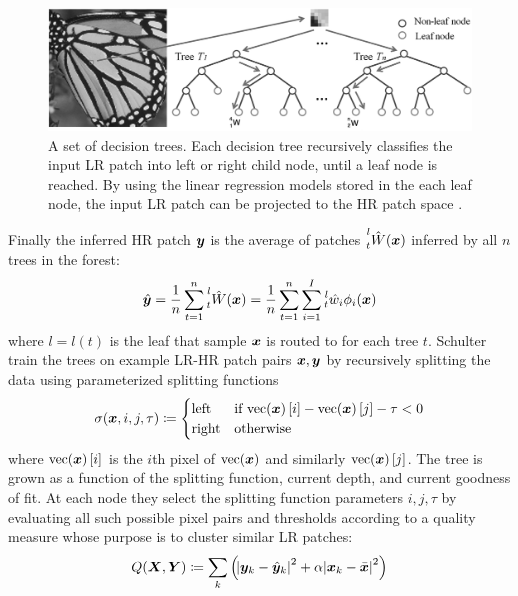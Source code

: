 \begin{figure}
    \centering
    \includegraphics[width=\linewidth,keepaspectratio]{figures/classical/FIRF.png}
    \caption{A set of decision trees. Each decision tree recursively classifies the input LR patch into left or right child node, until a leaf node is reached. By using the linear regression models stored in the each leaf node, the input LR patch can be projected to the HR patch space \cite{Huang}.}
    \label{fig:firf}
\end{figure}
%
Finally the inferred HR patch \(\bm{y}\) is the average of patches \(\prescript{l}{t}{\hat{W}(\bm{x})}\) inferred by all \(n\) trees in the forest:
\begin{equation}
    \hat{\bm{y}} = \frac{1}{n} \sum_{t=1}^{n} \prescript{l}{t}{\hat{W}(\bm{x})} =  \frac{1}{n} \sum_{t=1}^{n} \sum_{i=1}^I \prescript{l}{t}{\hat{w}_i}\phi_i(\bm{x})
\end{equation}
where \(l = l(t)\) is the leaf that sample \(\bm{x}\) is routed to for each tree \(t\).
%
Schulter \etal train the trees on example LR-HR patch pairs \(\bm{x}, \bm{y}\) by recursively splitting the data using parameterized splitting functions
\begin{equation}
    \sigma(\bm{x}, i, j, \tau)\coloneqq {
        \begin{cases}
            \text{left}  & \text{if } \text{vec}(\bm{x})\left[ i \right] - \text{vec}(\bm{x})\left[ j \right] - \tau < 0 \\
            \text{right} & \text{otherwise}
        \end{cases}
    }
\end{equation}
where \(\text{vec}(\bm{x})\left[ i \right]\) is the \(i\)th pixel of \(\text{vec}(\bm{x})\) and similarly \(\text{vec}(\bm{x})\left[ j \right]\).
%
The tree is grown as a function of the splitting function, current depth, and current goodness of fit.
%
At each node they select the splitting function parameters \(i, j, \tau\) by evaluating all such possible pixel pairs and thresholds according to a quality measure whose purpose is to cluster similar LR patches:
\begin{equation}
    Q(\bm{X}, \bm{Y}) \coloneqq \sum_k \left( \abs{ \bm{y}_k - \hat{\bm{y}}_k }^2 + \alpha\abs{ \bm{x}_k - \bar{\bm{x}} }^2 \right)
    \label{eqn:qualitymeasure}
\end{equation}
